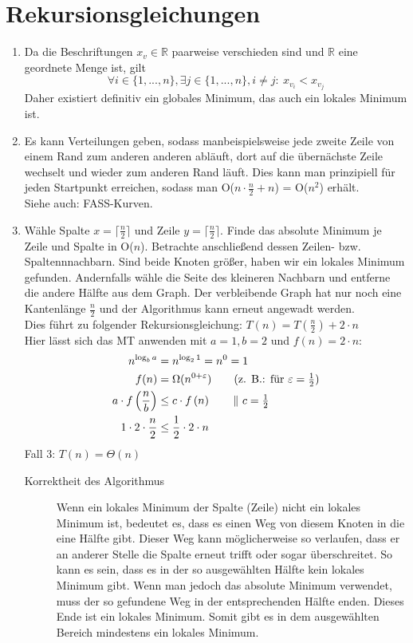 \documentclass[a4paper,10pt]{scrartcl}
\begin{document}
\section{Rekursionsgleichungen}
\begin{enumerate}
\item   Da die Beschriftungen $x_v \in \mathbb{R}$ paarweise verschieden sind und $\mathbb{R}$ eine geordnete Menge ist, gilt 
        \[\forall i \in \{1, ..., n\}, \exists j \in \{1, ..., n\}, i \neq j{:}\ x_{v_i} < x_{v_j}\]
        Daher existiert definitiv ein globales Minimum, das auch ein lokales Minimum ist.
\item  Es kann Verteilungen geben, sodass manbeispielsweise jede zweite Zeile von einem Rand zum anderen anderen abläuft, dort auf die übernächste Zeile wechselt und wieder zum anderen Rand läuft. Dies kann man prinzipiell für jeden Startpunkt erreichen, sodass man O($n \cdot \frac{n}{2} + n$) = O($n^2$) erhält.\\
Siehe auch: FASS-Kurven.
\item Wähle Spalte $x = \lceil\frac{n}{2}\rceil$ und Zeile $y = \lceil\frac{n}{2}\rceil$. Finde das absolute Minimum je Zeile und Spalte in O($n$). Betrachte anschließend dessen Zeilen- bzw. Spaltennnachbarn. Sind beide Knoten größer, haben wir ein lokales Minimum gefunden. Andernfalls wähle die Seite des kleineren Nachbarn und entferne die andere Hälfte aus dem Graph. Der verbleibende Graph hat nur noch eine Kantenlänge $\frac{n}{2}$ und der Algorithmus kann erneut angewadt werden.\\
Dies führt zu folgender Rekursionsgleichung: $T(n) = T\left(\frac{n}{2}\right) + 2\cdot n$\\
Hier lässt sich das MT anwenden mit $a = 1, b =2$ und $f(n) = 2 \cdot n$:
\begin{align*}
         n^{\log_b a} &= n^{\log_2 1} = n^0 = 1 \\
         f(n) &= \Omega(n^{0+\varepsilon}) \tag{z. B.: für $\varepsilon = \frac{1}{2}$} \\
         a \cdot f\left(\frac{n}{b}\right) &\leq c \cdot f\left(n\right) \tag*{$\|\ c = \frac{1}{2}$} \\
        1 \cdot 2 \cdot \frac{n}{2} & \leq \frac{1}{2} \cdot 2 \cdot n
\end{align*}
Fall 3: $T(n) = \Theta(n)$\\
\begin{description}
	\item[Korrektheit des Algorithmus] Wenn ein lokales Minimum der Spalte (Zeile) nicht ein lokales Minimum ist, bedeutet es, dass es einen Weg von diesem Knoten in die eine Hälfte gibt. Dieser Weg kann möglicherweise so verlaufen, dass er an anderer Stelle die Spalte erneut trifft oder sogar überschreitet. So kann es sein, dass es in der so ausgewählten Hälfte kein lokales Minimum gibt. Wenn man jedoch das absolute Minimum verwendet, muss der so gefundene Weg in der entsprechenden Hälfte enden. Dieses Ende ist ein lokales Minimum. Somit gibt es in dem ausgewählten Bereich mindestens ein lokales Minimum.
\end{description}
\end{enumerate}
\end{document}
